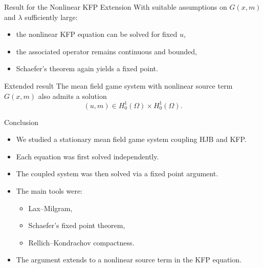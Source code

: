 \documentclass[aspectratio=169]{beamer}
\begin{document}
\begin{frame}{Result for the Nonlinear KFP Extension}
With suitable assumptions on \(G(x,m)\) and \(\lambda\) sufficiently large:
\begin{itemize}
    \item the nonlinear KFP equation can be solved for fixed \(u\),
    \item the associated operator remains continuous and bounded,
    \item Schaefer's theorem again yields a fixed point.
\end{itemize}

\vspace{0.4cm}

\begin{block}{Extended result}
The mean field game system with nonlinear source term \(G(x,m)\) also admits a solution
\[
(u,m)\in H_0^1(\Omega)\times H_0^1(\Omega).
\]
\end{block}
\end{frame}

\begin{frame}{Conclusion}
\begin{itemize}
    \item We studied a stationary mean field game system coupling HJB and KFP.
    \item Each equation was first solved independently.
    \item The coupled system was then solved via a fixed point argument.
    \item The main tools were:
    \begin{itemize}
        \item Lax--Milgram,
        \item Schaefer's fixed point theorem,
        \item Rellich--Kondrachov compactness.
    \end{itemize}
    \item The argument extends to a nonlinear source term in the KFP equation.
\end{itemize}
\end{frame}
\end{document}
